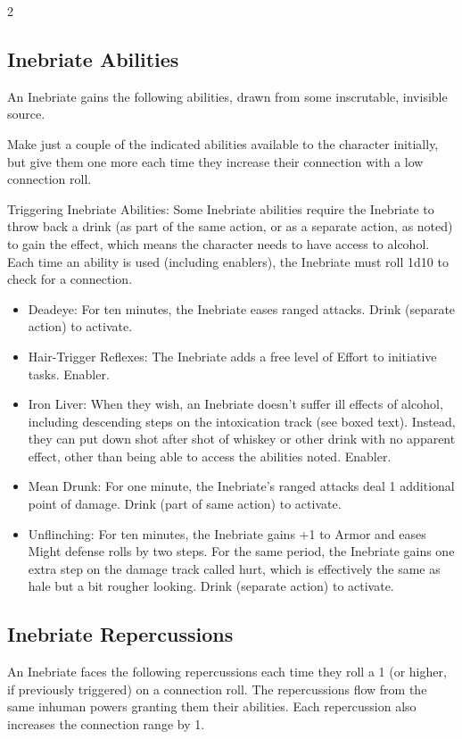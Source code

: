\begin{multicols}{2}
\subsection{Inebriate Abilities}

An Inebriate gains the following abilities, drawn from some inscrutable, invisible source. 

Make just a couple of the indicated abilities available to the character initially, but give them one more each time they increase their connection with a low connection roll. 

Triggering Inebriate Abilities: Some Inebriate abilities require the Inebriate to throw back a drink (as part of the same action, or as a separate action, as noted) to gain the effect, which means the character needs to have access to alcohol. Each time an ability is used (including enablers), the Inebriate must roll 1d10 to check for a connection.

\begin{itemize}
\item Deadeye: For ten minutes, the Inebriate eases ranged attacks. Drink (separate action) to activate. 
\item Hair-Trigger Reflexes: The Inebriate adds a free level of Effort to initiative tasks. Enabler. 
\item Iron Liver: When they wish, an Inebriate doesn’t suffer ill effects of alcohol, including descending steps on the intoxication track (see boxed text). Instead, they can put down shot after shot of whiskey or other drink with no apparent effect, other than being able to access the abilities noted. Enabler. 
\item Mean Drunk: For one minute, the Inebriate’s ranged attacks deal 1 additional point of damage. Drink (part of same action) to activate. 
\item Unflinching: For ten minutes, the Inebriate gains +1 to Armor and eases Might defense rolls by two steps. For the same period, the Inebriate gains one extra step on the damage track called hurt, which is effectively the same as hale but a bit rougher looking. Drink (separate action) to activate. 
\end{itemize}

\subsection{Inebriate Repercussions} 

An Inebriate faces the following repercussions each time they roll a 1 (or higher, if previously triggered) on a connection roll. The repercussions flow from the same inhuman powers granting them their abilities. Each repercussion also increases the connection range by 1.

\end{multicols}

